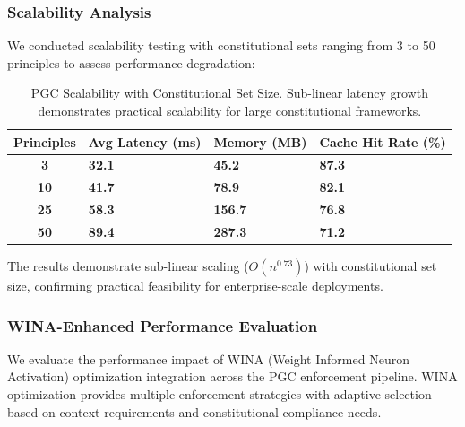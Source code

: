 \documentclass[manuscript,screen,review,anonymous,9pt]{acmart}
\newcommand{\tablesize}{\tiny}
\newcommand{\tablenumfmt}[1]{\textbf{#1}}
\newcommand{\tableheader}[1]{\textbf{#1}}
\begin{document}
\subsubsection{Scalability Analysis}
We conducted scalability testing with constitutional sets ranging from 3 to 50 principles to assess performance degradation:

\begin{table}[htbp]
	\centering
	\caption{PGC Scalability with Constitutional Set Size. Sub-linear latency growth demonstrates practical scalability for large constitutional frameworks.}
	\label{tab:pgc_scalability}
	\tablesize
	\begin{tabular}{@{}c>{\centering\arraybackslash}p{1.8cm}>{\centering\arraybackslash}p{1.6cm}>{\centering\arraybackslash}p{1.8cm}@{}}
		\toprule
		\tableheader{Principles} & \tableheader{Avg Latency (ms)} & \tableheader{Memory (MB)} & \tableheader{Cache Hit Rate (\%)} \\
		\midrule
		\tablenumfmt{3}          & \tablenumfmt{32.1}             & \tablenumfmt{45.2}        & \tablenumfmt{87.3}                \\
		\tablenumfmt{10}         & \tablenumfmt{41.7}             & \tablenumfmt{78.9}        & \tablenumfmt{82.1}                \\
		\tablenumfmt{25}         & \tablenumfmt{58.3}             & \tablenumfmt{156.7}       & \tablenumfmt{76.8}                \\
		\tablenumfmt{50}         & \tablenumfmt{89.4}             & \tablenumfmt{287.3}       & \tablenumfmt{71.2}                \\
		\bottomrule
	\end{tabular}
\end{table}

The results demonstrate sub-linear scaling ($O(n^{0.73})$) with constitutional set size, confirming practical feasibility for enterprise-scale deployments.

\subsubsection{WINA-Enhanced Performance Evaluation}
\label{subsubsec:wina_performance_evaluation}
We evaluate the performance impact of WINA (Weight Informed Neuron Activation) optimization integration across the PGC enforcement pipeline. WINA optimization provides multiple enforcement strategies with adaptive selection based on context requirements and constitutional compliance needs.
\end{document}
